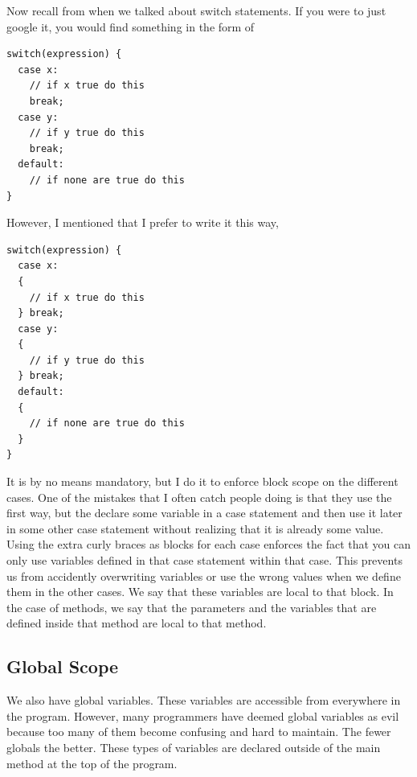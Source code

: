 \documentclass[11]{article}
\begin{document}
Now recall from when we talked about switch statements. If you were to just google it, you would find something in the form of

\begin{lstlisting}
switch(expression) {
  case x:
    // if x true do this
    break;
  case y:
    // if y true do this
    break;
  default:
    // if none are true do this
}
\end{lstlisting}

However, I mentioned that I prefer to write it this way, 
\begin{lstlisting}
switch(expression) {
  case x:
  {
    // if x true do this
  } break;
  case y:
  {
    // if y true do this
  } break;
  default:
  {
    // if none are true do this
  }
}
\end{lstlisting}

It is by no means mandatory, but I do it to enforce block scope on the different cases. One of the mistakes that I often catch people doing is that they use the first way, but the declare some variable in a case statement and then use it later in some other case statement without realizing that it is already some value. Using the extra curly braces as blocks for each case enforces the fact that you can only use variables defined in that case statement within that case. This prevents us from accidently overwriting variables or use the wrong values when we define them in the other cases. We say that these variables are local to that block. In the case of methods, we say that the parameters and the variables that are defined inside that method are local to that method.\\
\subsection{Global Scope}
We also have global variables. These variables are accessible from everywhere in the program. However, many programmers have deemed global variables as evil because too many of them become confusing and hard to maintain. The fewer globals the better. These types of variables are declared outside of the main method at the top of the program.
\end{document}
